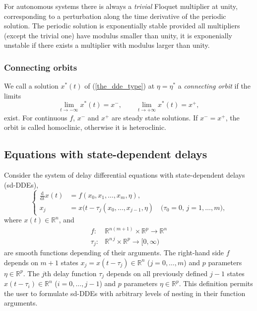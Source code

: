 \documentclass[10pt]{scrartcl}
\newcommand{\define}[1]{\emph{#1}}
\renewcommand{\d}{\mathrm{d}}
\newcommand{\RR}{\mathbb{R}}
\begin{document}
For autonomous systems there is always a \define{trivial} Floquet
multiplier at unity, corresponding to a perturbation along the time
derivative of the periodic solution. The periodic solution is
exponentially stable provided all multipliers (except the trivial one)
have modulus smaller than unity, it is exponenially unstable if there
exists a multiplier with modulus larger than unity.

\subsubsection{Connecting orbits}
\label{sec:dde:hcli}
We call a solution $x^*(t)$ of (\ref{the_dde_type}) at $\eta=\eta^*$ a 
\textit{connecting orbit} if the limits 
\begin{equation}
\lim_{t\to -\infty} x^*(t)=x^{-}, \qquad \lim_{t\to +\infty} x^*(t)=x^{+},
\end{equation}
exist.  For continuous $f$, $x^-$ and $x^+$ 
are steady state solutions. 
If $x^-=x^+$, the orbit is called homoclinic, otherwise it is heteroclinic. 

\subsection{Equations with state-dependent delays}\label{sd_dde}

Consider the system of delay differential equations with
state-dependent delays (sd-DDEs),
\begin{equation}\label{the_dde_type2}
\left\{
\begin{aligned}
\frac{\d}{\d t}{x(t)}&=f(x_0,x_1,\ldots,x_m,\eta),\\
x_j&=x(t-\tau_j(x_0,\ldots,x_{j-1},\eta)\quad\mbox{($\tau_0=0$, $j=1,\ldots,m$)}\mbox{,}
\end{aligned}
\right.
\end{equation}
where $x(t)\in\RR^n$, and
\begin{align*}
 f:&\RR^{n(m+1)}\times\RR^p \to\RR^n\\
 \tau_j:&\RR^{n\,j}\times\RR^p\to[0,\infty)
\end{align*}
are smooth functions depending of their arguments. The right-hand side
$f$ depends on $m+1$ states $x_j=x(t-\tau_j)\in\RR^n$ ($j=0,\ldots,m$)
and $p$ parameters $\eta\in\RR^p$. The $j$th delay function $\tau_j$
depends on all previously defined $j-1$ states $x(t-\tau_i)\in\RR^n$
($i=0,\ldots,j-1$) and $p$ parameters $\eta\in\RR^p$. This
definition permits the user to formulate sd-DDEs with arbitrary levels
of nesting in their function arguments.
\end{document}
